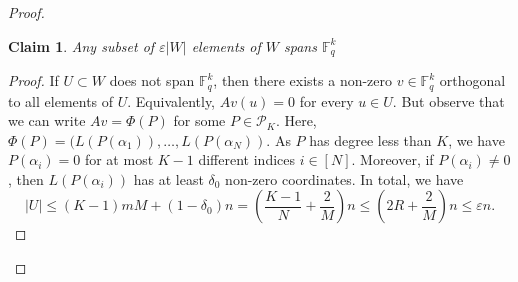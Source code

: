 \documentclass[10pt,a4paper]{amsart}
\newtheorem{claim}{Claim}
\begin{document}
\begin{proof}
 
\begin{claim} 
Any subset of $\varepsilon|W|$ elements of $W$ spans $\mathbb{F}_q^k$
\end{claim} 
\begin{proof} 
If $U\subset W$ does not span $\mathbb{F}_q^k$, then there exists a non-zero $v\in \mathbb{F}_q^k$ orthogonal to all elements of $U$. Equivalently, $Av(u)=0$ for every $u\in U$. But observe that we can write  $Av=\Phi(P)$ for some $P\in \mathcal{P}_K$. Here, $\Phi(P)=(L(P(\alpha_1)),\dots,L(P(\alpha_N))$. As $P$ has degree less than $K$, we have $P(\alpha_i)=0$ for at most $K-1$ different indices $i\in [N]$. Moreover, if $P(\alpha_i)\neq 0$, then $L(P(\alpha_i))$ has at least $\delta_0$ non-zero coordinates. In total, we have
$$|U|\leq (K-1)mM+(1-\delta_0)n=\left(\frac{K-1}{N}+\frac{2}{M}\right)n\leq \left(2R+\frac{2}{M}\right)n\leq \varepsilon n.$$
\end{proof}

\end{proof}
\end{document}
